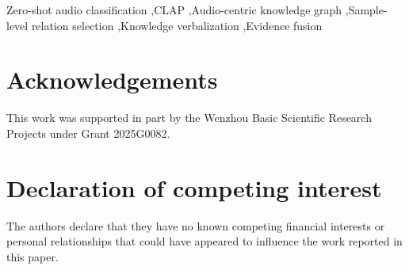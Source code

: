 \documentclass[final,5p,times,twocolumn]{elsarticle}
\newcommand{\methodrevision}[1]{{\color{red}#1}}
\begin{document}
\begin{frontmatter}
\begin{abstract}
\begin{CJK*}{UTF8}{gbsn}
零样本音频分类通过匹配音频与自然语言类别描述，使预训练模型无需针对目标任务重新训练即可识别声音。然而，简短的类别名称难以充分表达声音事件的来源、场景及语义联系，限制了音频--文本匹配所能利用的信息。知识图谱能够补充这些语义联系，但如何选择适合当前音频的知识、准确表达关系语义并协调其对分类决策的影响，仍是知识增强中的关键问题。为此，本文提出样本自适应知识整合框架（Sample-Adaptive Knowledge Integration，SAKI），在保持对比语言--音频预训练模型（CLAP）参数不变的条件下，利用结构化知识改善候选类别排序。该框架通过音频对齐知识语言化模块（Audio-Aligned Knowledge Verbalization，AAKV），利用声音导向指令和实体--关系约束，引导大语言模型将三元组转换为自然语言证据；在此基础上，将不同关系下的知识增强预测构建为关系专家，结合预测共识与分类间隔，无需测试标签即可选择适合当前音频的关系；随后，在类别内部聚合所选知识证据，并与原始CLAP分数进行分层融合。\methodrevision{在五个公开音频数据集上，SAKI相较于本文复现的iKnow-audio，Hit@1提高了2.08--12.73个百分点，MRR提高了1.02--6.68个百分点。}本文将类别关联的结构化知识转化为面向当前音频的判别证据，为缓解类别描述的语义不足、实现样本自适应的知识增强提供了统一框架。
\end{CJK*}
\end{abstract}

\begin{keyword}
Zero-shot audio classification \sep CLAP \sep Audio-centric knowledge graph \sep Sample-level relation selection \sep Knowledge verbalization \sep Evidence fusion
\end{keyword}

\end{frontmatter}








\section*{Acknowledgements}
This work was supported in part by the Wenzhou Basic Scientific Research Projects under Grant 2025G0082.

\section*{Declaration of competing interest}
The authors declare that they have no known competing financial interests or personal relationships that could have appeared to influence the work reported in this paper.
\end{document}
